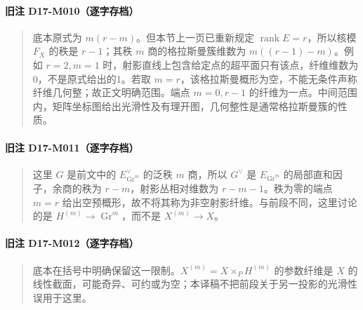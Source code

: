 \paragraph*{旧注 D17-M010（逐字存档）}
\begin{quote}
底本原式为 $m(r-m)$。但本节上一页已重新规定 $\operatorname{rank}E=r$，所以核模 $F_X$ 的秩是 $r-1$；其秩 $m$ 商的格拉斯曼簇维数为 $m((r-1)-m)$。例如 $r=2,m=1$ 时，射影直线上包含给定点的超平面只有该点，纤维维数为0，不是原式给出的1。若取 $m=r$，该格拉斯曼概形为空，不能无条件声称纤维几何整；故正文明确范围。端点 $m=0,r-1$ 的纤维为一点。中间范围内，矩阵坐标图给出光滑性及有理开图，几何整性是通常格拉斯曼簇的性质。
\end{quote}

\paragraph*{旧注 D17-M011（逐字存档）}
\begin{quote}
这里 $G$ 是前文中的 $E^\vee_{\operatorname{Gr}^{m}}$ 的泛秩 $m$ 商，所以 $G^\vee$ 是 $E_{\operatorname{Gr}^{m}}$ 的局部直和因子，余商的秩为 $r-m$，射影丛相对维数为 $r-m-1$。秩为零的端点 $m=r$ 给出空预概形，故不将其称为非空射影纤维。与前段不同，这里讨论的是 $H^{(m)}\to\operatorname{Gr}^{m}$，而不是 $X^{(m)}\to X$。
\end{quote}

\paragraph*{旧注 D17-M012（逐字存档）}
\begin{quote}
底本在括号中明确保留这一限制。$X^{(m)}=X\times_P H^{(m)}$ 的参数纤维是 $X$ 的线性截面，可能奇异、可约或为空；本译稿不把前段关于另一投影的光滑性误用于这里。
\end{quote}

